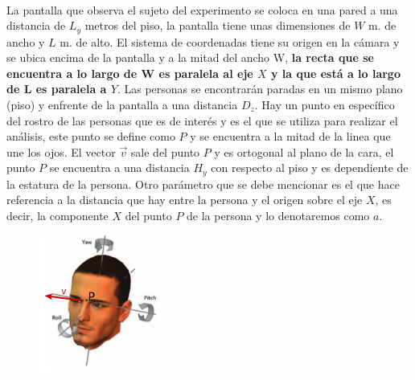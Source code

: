 \documentclass[paper=a4, fontsize=11pt]{scrartcl} %
\numberwithin{equation}{section} %
\numberwithin{figure}{section} %
\numberwithin{table}{section} %
\begin{document}
\\La pantalla que observa el sujeto del experimento se coloca en una pared a una distancia de $L_y$ metros del piso, la pantalla tiene unas dimensiones de $W$ m. de ancho y $L$ m. de alto. El sistema de coordenadas tiene su origen en la cámara y se ubica  encima de la pantalla y a la mitad del ancho W, \textbf{la recta que se encuentra a lo largo de W es paralela al eje $X$ y la que está a lo largo de L es paralela a $Y$}. Las personas se encontrarán paradas en un mismo plano (piso) y enfrente de la pantalla a una distancia $D_z$. Hay un punto en específico del rostro de las personas que es de interés y es el que se utiliza para realizar el análisis, este punto se define como $P$ y se encuentra a la mitad de la linea que une los ojos. El vector $\vec v$ sale del punto $P$ y es ortogonal al plano de la cara, el punto $P$ se encuentra a una distancia $H_y$ con respecto al piso y es dependiente de la estatura de la persona. Otro parámetro que se debe mencionar es el que hace referencia a la distancia que hay entre la persona y el origen sobre el eje $X$, es decir, la componente $X$ del punto $P$ de la persona y lo denotaremos como $a$.%

\begin{figure}[htbp]
\centering
\includegraphics[width=0.36\textwidth]{personaMirando}
\caption{}\label{fig: figura}
\end{figure}
\end{document}
